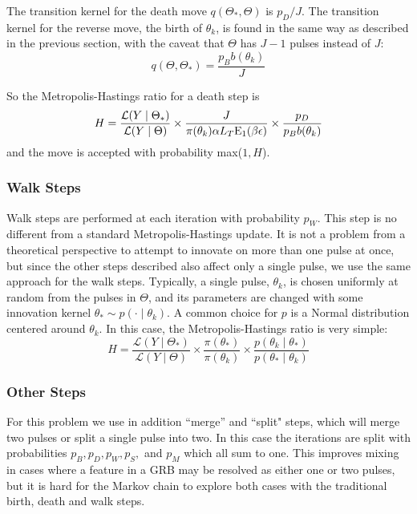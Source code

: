 \documentclass[12pt,letterpaper]{article}
\begin{document}
The transition kernel for the death move $q(\Theta_*, \Theta)$ is $p_D/J$. The transition kernel for the reverse move, the birth of $\theta_k$, is found in the same way as described in the previous section, with the caveat that $\Theta$ has $J-1$ pulses instead of $J$:
\[ q(\Theta, \Theta_*) = \frac{p_B  b(\theta_k)}{ J} \]

So the Metropolis-Hastings ratio for a death step is
\begin{equation}
 H = \frac{\mathcal{L}(Y \mid \Theta_* )}{\mathcal{L}(Y \mid \Theta )}
     \times \frac{J}{\pi(\theta_k) \alpha L_T  {\mathrm{E}_1}(\beta \epsilon)} 
     \times \frac{p_D}{p_B b(\theta_k)}
\end{equation}
and the move is accepted with probability max($1,H$).
\subsubsection{Walk Steps}
Walk steps are performed at each iteration with probability $p_W$. This step is no different from a standard Metropolis-Hastings update.  It is not a problem from a theoretical perspective to attempt to innovate on more than one pulse at once, but since the other steps described also affect only a single pulse, we use the same approach for the walk steps. Typically, a single pulse, $\theta_k$, is chosen uniformly at random from the pulses in $\Theta$, and its parameters are changed with some innovation kernel $\theta_* \sim p(\cdot\mid \theta_k )$. A common choice for $p$ is a Normal distribution centered around $\theta_k$. In this case, the Metropolis-Hastings ratio is very simple:
\begin{equation}
 H = \frac{\mathcal{L}(Y \mid \Theta_* )}{\mathcal{L}(Y \mid \Theta )} 
     \times \frac{\pi(\theta_*)}{\pi(\theta_k)}
     \times \frac{p(\theta_k \mid \theta_*)}{p(\theta_* \mid  \theta_k)}
\end{equation}


\subsubsection{Other Steps}

    For this problem we use in addition  ``merge'' and ``split" steps, which will merge two pulses or split a single pulse into two. In this case the iterations are split with probabilities $p_B, p_D, p_W, p_S,$ and $p_M$ which all sum to one. This improves mixing in cases where a feature in a GRB may be resolved as either one or two pulses, but it is hard for the Markov chain to explore both cases with the traditional birth, death and walk steps.
\end{document}
